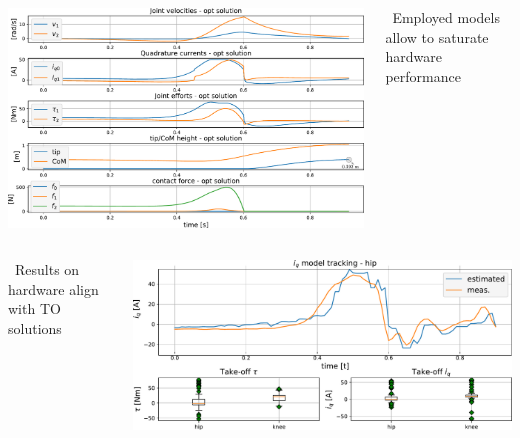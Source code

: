 \begin{Large}
\vskip0.5cm
\begin{columns}[c]
	\begin{column}{0.7\textwidth}
		\includegraphics[width=1.0\textwidth]{docs/imgs/hardware_saturation_opt.pdf}
	\end{column}
	\begin{column}{0.25\textwidth}
		\themarker~Employed models allow to saturate hardware performance
	\end{column}
\end{columns}
\vskip0.5cm
\begin{columns}[c]
	\begin{column}{0.25\textwidth}
		\themarker~Results on hardware align with TO solutions 
	\end{column}
	\begin{column}{0.7\textwidth}
		\includegraphics[width=1.0\textwidth]{docs/imgs/hardware_saturation.pdf}
	\end{column}
\end{columns}
\end{Large}                                                                        
